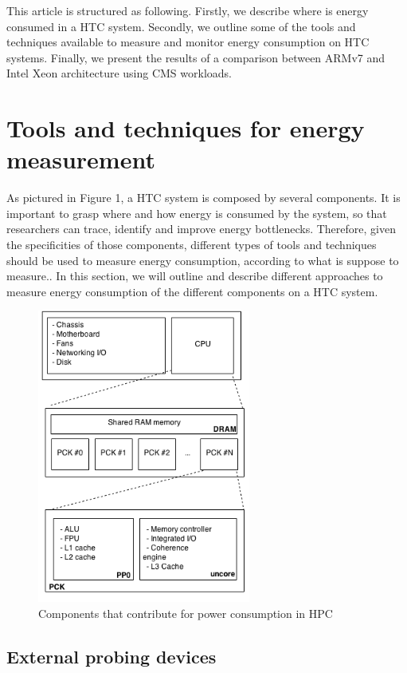 \documentclass[a4paper]{jpconf}
\begin{document}
This article is structured as following. Firstly, we describe where is energy 
consumed in a HTC system. Secondly, we outline some of the tools and techniques 
available to measure and monitor energy consumption on HTC systems. Finally, we 
present the results of a comparison between ARMv7 and Intel Xeon architecture 
using CMS workloads.


\section{Tools and techniques for energy measurement}
As pictured in Figure 1, a HTC system is composed by several components.
It is important to grasp where and how energy is consumed by 
the system, so that researchers can trace, identify and improve energy 
bottlenecks. Therefore, given the specificities of those components, different 
types
of tools and techniques should be used to measure energy consumption, according
to what is suppose to measure.. 
In this section, we will outline and describe different approaches to measure 
energy consumption of the different components on a HTC system.  

\begin{figure}[ht!]
\centering
\includegraphics[width=70mm]{img/energy_model.png}
\caption{Components that contribute for power consumption in HPC}
\label{overflow}
\end{figure}

\subsection{External probing devices}
\end{document}
